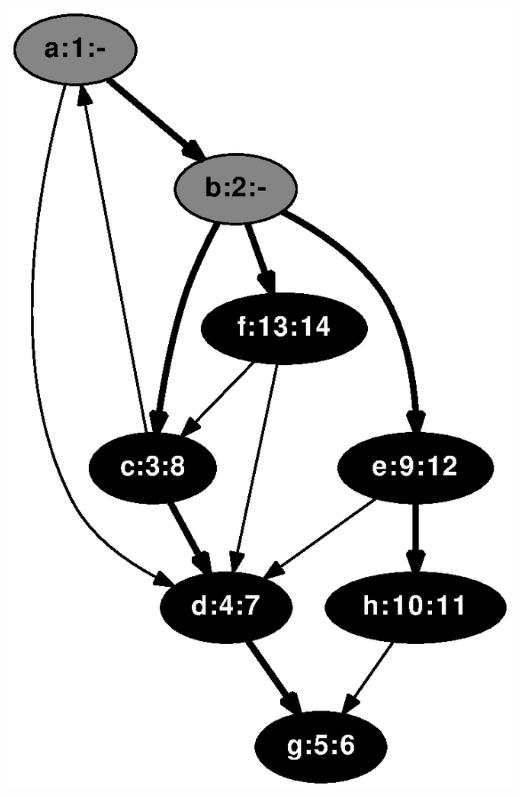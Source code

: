 \documentclass{article}
\begin{document}
\includegraphics[height=.3\textheight]{dfs_directed_classroom_14.eps}
\vspace{1em}
\end{document}
